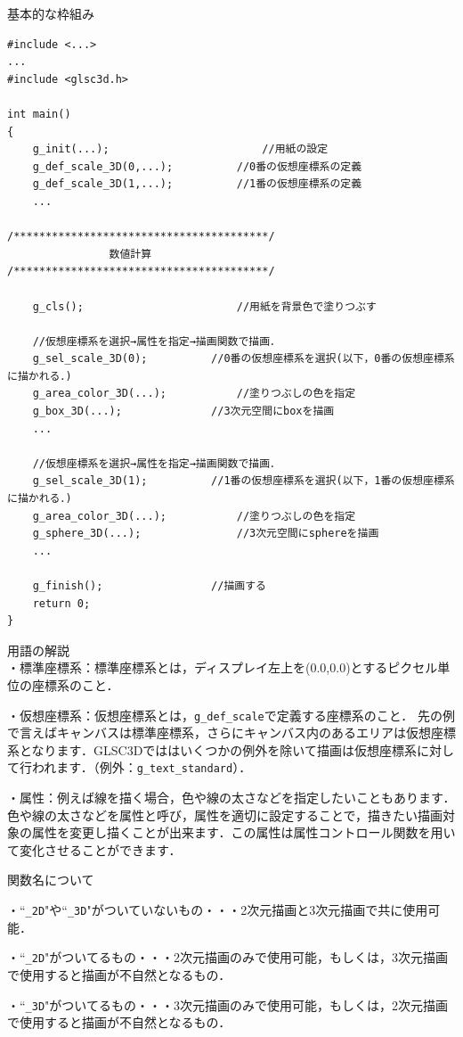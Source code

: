 \documentclass[a4paper,12pt]{jsarticle}%
\begin{document}
\newpage
基本的な枠組み
\begin{verbatim}
#include <...>
...
#include <glsc3d.h>

int main()
{
    g_init(...);						//用紙の設定
    g_def_scale_3D(0,...);			//0番の仮想座標系の定義
    g_def_scale_3D(1,...);			//1番の仮想座標系の定義
    ...
        
/****************************************/	
                数値計算
/****************************************/

    g_cls();						//用紙を背景色で塗りつぶす
   
    //仮想座標系を選択→属性を指定→描画関数で描画．
    g_sel_scale_3D(0);			//0番の仮想座標系を選択(以下，0番の仮想座標系に描かれる．)	
    g_area_color_3D(...);			//塗りつぶしの色を指定
    g_box_3D(...);				//3次元空間にboxを描画
    ...
    
    //仮想座標系を選択→属性を指定→描画関数で描画．
    g_sel_scale_3D(1);			//1番の仮想座標系を選択(以下，1番の仮想座標系に描かれる．)
    g_area_color_3D(...);			//塗りつぶしの色を指定
    g_sphere_3D(...);				//3次元空間にsphereを描画
    ...
           
    g_finish();					//描画する
    return 0;
}

\end{verbatim}
用語の解説\\
\noindent
・標準座標系：標準座標系とは，ディスプレイ左上を(0.0,0.0)とするピクセル単位の座標系のこと．

\noindent
・仮想座標系：仮想座標系とは，\verb|g_def_scale|で定義する座標系のこと．
先の例で言えばキャンバスは標準座標系，さらにキャンバス内のあるエリアは仮想座標系となります．GLSC3Dでははいくつかの例外を除いて描画は仮想座標系に対して行われます．（例外：\verb|g_text_standard|）．

\noindent
・属性：例えば線を描く場合，色や線の太さなどを指定したいこともあります．色や線の太さなどを属性と呼び，属性を適切に設定することで，描きたい描画対象の属性を変更し描くことが出来ます．この属性は属性コントロール関数を用いて変化させることができます．

\vspace{5mm}
\noindent
関数名について

\noindent
・``\verb|_2D|"や``\verb|_3D|"がついていないもの・・・2次元描画と3次元描画で共に使用可能．

\noindent
・``\verb|_2D|"がついてるもの・・・2次元描画のみで使用可能，もしくは，3次元描画で使用すると描画が不自然となるもの．

\noindent
・``\verb|_3D|"がついてるもの・・・3次元描画のみで使用可能，もしくは，2次元描画で使用すると描画が不自然となるもの．
\end{document}
